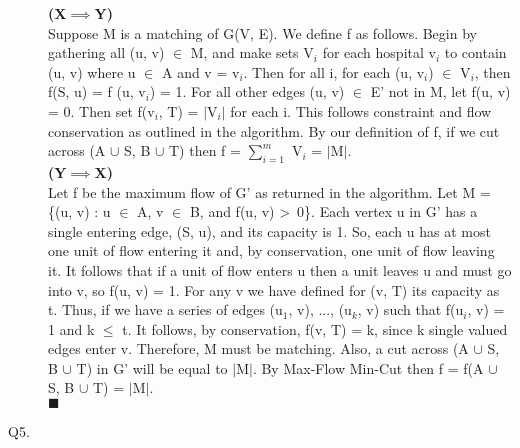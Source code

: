 \documentclass[10pt]{csc_assignment}
\begin{document}
\begin{description}
\textbf{(X$\implies$Y)}\\
Suppose M is a matching of G(V, E). We define f as follows. Begin by gathering all (u, v) $\in$ M, and make sets V$_{i}$ for each hospital v$_{i}$ to contain (u, v) where u $\in$ A and v = v$_{i}$. Then for all i, for each (u, v$_{i}$) $\in$ V$_{i}$, then f(S, u) = f (u, v$_{i}$) = 1. For all other edges (u, v) $\in$ E' not in M, let f(u, v) = 0. Then set f(v$_{i}$, T) = $\mid$V$_{i}$$\mid$ for each i. This follows constraint and flow conservation as outlined in the algorithm. By our definition of f, if we cut across (A $\cup$ {S}, B $\cup$ {T}) then f = $\sum_{i=1}^{m}$ V$_{i}$ = $\mid$M$\mid$.\\
\textbf{(Y$\implies$X)}\\
Let f be the maximum flow of G' as returned in the algorithm. Let M = \{(u, v) : u $\in$ A, v $\in$ B, and f(u, v) \textgreater ~0\}. Each vertex u in G' has a single entering edge, (S, u), and its capacity is 1. So, each u has at most one unit of flow entering it and, by conservation, one unit of flow leaving it. It follows that if a unit of flow enters u then a unit leaves u and must go into v, so f(u, v) = 1. For any v we have defined for (v, T) its capacity as t. Thus, if we have a series of edges {(u$_{1}$, v), ..., (u$_{k}$, v)} such that f(u$_{i}$, v) = 1 and k $\leqslant$ t. It follows, by conservation, f(v, T) = k, since k single valued edges enter v. Therefore, M must be matching. Also, a cut across (A $\cup$ {S}, B $\cup$ {T}) in G' will be equal to $\mid$M$\mid$. By Max-Flow Min-Cut then f = f(A $\cup$ {S}, B $\cup$ {T}) = $\mid$M$\mid$. \\$\blacksquare$\\
    

\newpage
\item[Q5.]


\end{description}
\end{document}

